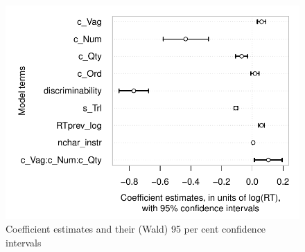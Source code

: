 \documentclass[a4paper,12pt,twoside]{article}\usepackage[]{graphicx}\usepackage[]{color}
\makeatletter
\def\maxwidth{ %
  \ifdim\Gin@nat@width>\linewidth
    \linewidth
  \else
    \Gin@nat@width
  \fi
}
\newenvironment{knitrout}{}{} %
\makeatother
\begin{document}
\begin{knitrout}\scriptsize
{}\color{fgcolor}\begin{figure}[hbtp]

{\centering \includegraphics[width=\maxwidth]{figure/graphics-plotModelCoefsAndCis-1} 

}

\caption[Coefficient estimates and their (Wald) 95 per cent confidence intervals]{Coefficient estimates and their (Wald) 95 per cent confidence intervals}\label{fig:plotModelCoefsAndCis}
\end{figure}


\end{knitrout}


\clearpage 
\end{document}

